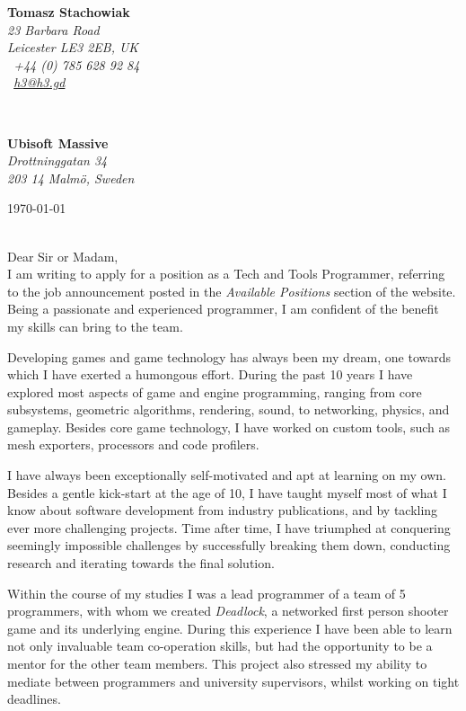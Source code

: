\documentclass[11pt]{article}
\begin{document}
\hfill%
\begin{minipage}[t]{.6\textwidth}
\raggedleft%
{\bfseries Tomasz Stachowiak}\\[.35ex]
\small\itshape%
23 Barbara Road\\
Leicester LE3 2EB, UK\\[.35ex]
\Telefon~+44 (0) 785 628 92 84\\
\Letter~\href{mailto:h3@h3.gd}{h3@h3.gd}
\end{minipage}\\[1em]
%
\begin{minipage}[t]{.4\textwidth}
\raggedright%
{\bfseries Ubisoft Massive}\\[.35ex]
\small\itshape%
Drottninggatan 34\\
203 14 Malmö, Sweden
\end{minipage}
\hfill %
\begin{minipage}[t]{.4\textwidth}
\raggedleft %
\today
\end{minipage}\\[2em]
Dear Sir or Madam,\\[1.5em]
%
I am writing to apply for a position as a Tech and Tools Programmer, referring to the job announcement posted in the \emph{Available Positions} section of the website. Being a passionate and experienced programmer, I am confident of the benefit my skills can bring to the team.

Developing games and game technology has always been my dream, one towards which I have exerted a humongous effort. During the past 10 years I have explored most aspects of game and engine programming, ranging from core subsystems, geometric algorithms, rendering, sound, to networking, physics, and gameplay. Besides core game technology, I have worked on custom tools, such as mesh exporters, processors and code profilers.

I have always been exceptionally self-motivated and apt at learning on my own. Besides a gentle kick-start at the age of 10, I have taught myself most of what I know about software development from industry publications, and by tackling ever more challenging projects. Time after time, I have triumphed at conquering seemingly impossible challenges by successfully breaking them down, conducting research and iterating towards the final solution.

Within the course of my studies I was a lead programmer of a team of 5 programmers, with whom we created \emph{Deadlock}, a networked first person shooter game and its underlying engine. During this experience I have been able to learn not only invaluable team co-operation skills, but had the opportunity to be a mentor for the other team members. This project also stressed my ability to mediate between programmers and university supervisors, whilst working on tight deadlines.
\end{document}
